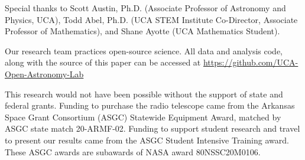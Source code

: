 \noindent Special thanks to Scott Austin, Ph.D. (Associate Professor of Astronomy and Physics, UCA), Todd Abel, Ph.D. (UCA STEM Institute Co-Director, Associate Professor of Mathematics), and Shane Ayotte (UCA Mathematics Student).

Our research team practices open-source science. All data and analysis code, along with the source of this paper can be accessed at \url{https://github.com/UCA-Open-Astronomy-Lab}

This research would not have been possible without the support of state and federal grants. Funding to purchase the radio telescope came from the Arkansas Space Grant Consortium (ASGC) Statewide Equipment Award, matched by ASGC state match 20-ARMF-02. Funding to support student research and travel to present our results came from the ASGC Student Intensive Training award. These ASGC awards are subawards of NASA award 80NSSC20M0106.
